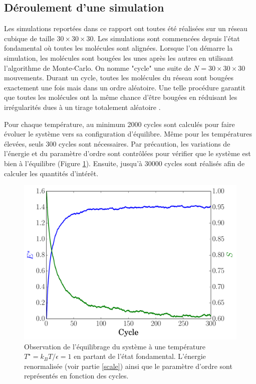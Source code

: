 \documentclass[11pt]{article}
\numberwithin{equation}{section}
\begin{document}
\subsection{Déroulement d'une simulation} 
Les simulations reportées dans ce rapport ont toutes été réalisées sur un réseau cubique de taille $30\times 30\times 30$. Les simulations sont commencées depuis l'état fondamental où toutes les molécules sont alignées. Lorsque l'on démarre la simulation, les molécules sont bougées les unes après les autres en utilisant l'algorithme de Monte-Carlo. On nomme "cycle" une suite de $N = 30\times 30\times 30$ mouvements. Durant un cycle, toutes les molécules du réseau sont bougées exactement une fois mais dans un ordre aléatoire. Une telle procédure garantit que toutes les molécules ont la même chance d'être bougées en réduisant les irrégularités dues à un tirage totalement aléatoire \cite{fabbri}. 
\medskip

Pour chaque température, au minimum 2000 cycles sont calculés pour faire évoluer le système vers sa configuration d'équilibre. Même pour les températures élevées, seuls 300 cycles sont nécessaires. Par précaution, les variations de l'énergie et du paramètre d'ordre sont contrôlées pour vérifier que le système est bien à l'équilibre (Figure \ref{equilibrage}). Ensuite, jusqu'à 30000 cycles sont réalisés afin de calculer les quantités d'intérêt.

\begin{figure}[h!]
    \centering	    
	\includegraphics[scale=0.6]{figures/equilibrage.pdf}
    \caption{Observation de l'équilibrage du système à une température $T^\star = k_B T/\epsilon = 1$ en partant de l'état fondamental. L'énergie renormalisée (voir partie \ref{scale}) ainsi que le paramètre d'ordre sont représentés en fonction des cycles.}
    	\label{equilibrage} 
\end{figure}
\end{document}
